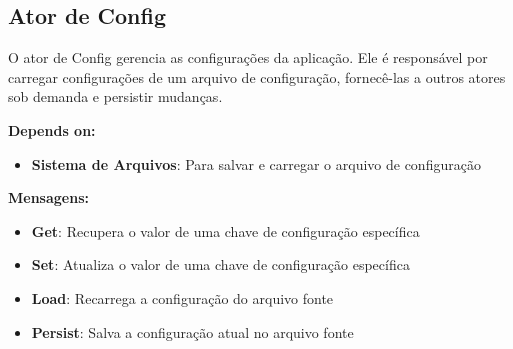 \subsection{Ator de Config}

O ator de Config gerencia as configurações da aplicação. Ele é responsável por carregar configurações de um arquivo de configuração, fornecê-las a outros atores sob demanda e persistir mudanças.

\textbf{Depends on:}

\begin{itemize}
    \item \textbf{Sistema de Arquivos}: Para salvar e carregar o arquivo de configuração
\end{itemize}

\textbf{Mensagens:}

\begin{itemize}
    \item \textbf{Get}: Recupera o valor de uma chave de configuração específica
    \item \textbf{Set}: Atualiza o valor de uma chave de configuração específica
    \item \textbf{Load}: Recarrega a configuração do arquivo fonte
    \item \textbf{Persist}: Salva a configuração atual no arquivo fonte
\end{itemize}
